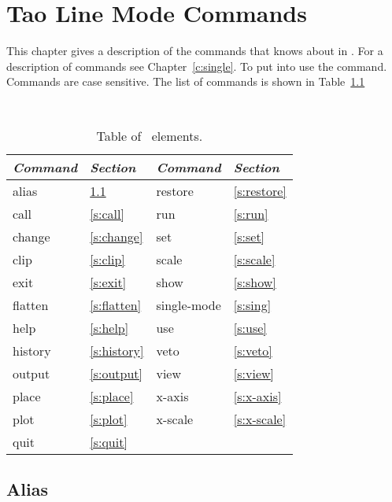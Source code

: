 \chapter{Tao Line Mode Commands}
\label{c:commands}

This chapter gives a description of the commands that \tao knows about
in . For a description of  commands
see Chapter~\ref{c:single}. To put \tao into  use the
 command.
Commands are case sensitive. The list of commands 
is shown in Table~\ref{t:commands}

\begin{table}[h]
\centering
{\tt
\begin{tabular}{|l|l||l|l|} \hline
  {\it Command} & {\it Section}  & {\it Command} & {\it Section} \\ \hline
  alias    & \ref{s:alias}    &  restore     & \ref{s:restore} \\ \hline
  call     & \ref{s:call}     &  run         & \ref{s:run}     \\ \hline
  change   & \ref{s:change}   &  set         & \ref{s:set}     \\ \hline
  clip     & \ref{s:clip}     &  scale       & \ref{s:scale}   \\ \hline
  exit     & \ref{s:exit}     &  show        & \ref{s:show}    \\ \hline
  flatten  & \ref{s:flatten}  &  single-mode & \ref{s:sing}    \\ \hline
  help     & \ref{s:help}     &  use         & \ref{s:use}     \\ \hline
  history  & \ref{s:history}  &  veto        & \ref{s:veto}    \\ \hline
  output   & \ref{s:output}   &  view        & \ref{s:view}    \\ \hline
  place    & \ref{s:place}    &  x-axis      & \ref{s:x-axis}  \\ \hline
  plot     & \ref{s:plot}     &  x-scale     & \ref{s:x-scale} \\ \hline
  quit     & \ref{s:quit}     &              &                 \\ \hline
\end{tabular}
}
\caption{Table of \bmad\ elements.}
\label{t:commands}
\end{table}

\vfil
\break

\section{Alias}
\label{s:alias}

